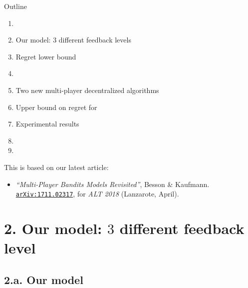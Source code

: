 \documentclass[12pt,english,ignorenonframetext,aspectratio=169,]{beamer}
\providecommand{\tightlist}{%
  \setlength{\itemsep}{0pt}\setlength{\parskip}{0pt}}
\begin{document}
\begin{frame}{Outline }

\vspace*{-15pt}

\begin{enumerate}
\def\labelenumi{\arabic{enumi}.}
\tightlist
\item
\item
  Our model: \(3\) different feedback levels
\item
  Regret lower bound
\item
\item
  Two new multi-player decentralized algorithms
\item
  Upper bound on regret for \MCTopM
\item
  Experimental results
\item
\item
\end{enumerate}

\pause

\vfill{}

\begin{footnotesize}
This is based on our latest article:
\begin{itemize}
\item \emph{``Multi-Player Bandits Models Revisited''}, Besson \& Kaufmann.
\hspace*{50pt}\texttt{\textcolor{blue}{\href{https://arXiv.org/abs/1711.02317}{arXiv:1711.02317}}}, for \emph{ALT 2018} (Lanzarote, April).
\end{itemize}
\end{footnotesize}

\end{frame}



\section{\hfill{}2. Our model: $3$ different feedback level\hfill{}}

\subsection{\hfill{}2.a. Our model\hfill{}}
\end{document}
